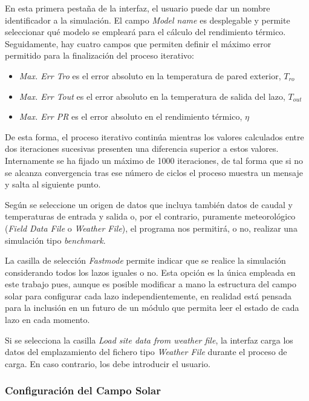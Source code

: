 En esta primera pestaña de la interfaz, el usuario puede dar un nombre identificador a la simulación. El campo \emph{Model name} es desplegable y permite seleccionar qué modelo se empleará para el cálculo del rendimiento térmico. Seguidamente, hay cuatro campos que permiten definir el máximo error permitido para la finalización del proceso iterativo:

\begin{itemize}
\item
\emph{Max. Err Tro} es el error absoluto en la temperatura de pared exterior, $T_{ro}$
\item
\emph{Max. Err Tout} es el error absoluto en la temperatura de salida del lazo, $T_{out}$
\item
\emph{Max. Err PR} es el error absoluto en el rendimiento térmico, $\eta$
\end{itemize}

De esta forma, el proceso iterativo continúa mientras los valores calculados entre dos iteraciones sucesivas presenten una diferencia superior a estos valores. Internamente se ha fijado un máximo de 1000 iteraciones, de tal forma que si no se alcanza convergencia tras ese número de ciclos el proceso muestra un mensaje y salta al siguiente punto.

Según se seleccione un origen de datos que incluya también datos de caudal y temperaturas de entrada y salida o, por el contrario, puramente meteorológico (\emph{Field Data File} o \emph{Weather File}), el programa nos permitirá, o no, realizar una simulación tipo \emph{benchmark}. 

La casilla de selección \emph{Fastmode} permite indicar que se realice la simulación considerando todos los lazos iguales o no. Esta opción es la única empleada en este trabajo pues, aunque es posible modificar a mano la estructura del campo solar para configurar cada lazo independientemente, en realidad está pensada para la inclusión en un futuro de un módulo que permita leer el estado de cada lazo en cada momento.

Si se selecciona la casilla \emph{Load site data from weather file}, la interfaz carga los datos del emplazamiento del fichero tipo \emph{Weather File} durante el proceso de carga. En caso contrario, los debe introducir el usuario.

\subsubsection{Configuración del Campo Solar}


